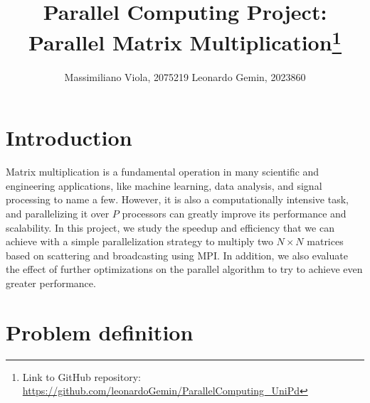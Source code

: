 \documentclass[11pt]{article}
\title{Parallel Computing Project:\\Parallel Matrix Multiplication\footnote{Link to GitHub repository: \url{https://github.com/leonardoGemin/ParallelComputing_UniPd}}}
\author{Massimiliano Viola, 2075219 \qquad Leonardo Gemin, 2023860}
\date{}
\begin{document}
\maketitle

\section{Introduction}

Matrix multiplication is a fundamental operation in many scientific and engineering applications, like machine learning, data analysis, and signal processing to name a few. However, it is also a computationally intensive task, and parallelizing it over $P$ processors can greatly improve its performance and scalability. In this project, we study the speedup and efficiency that we can achieve with a simple parallelization strategy to multiply two $N\times N$ matrices based on scattering and broadcasting using MPI. In addition, we also evaluate the effect of further optimizations on the parallel algorithm to try to achieve even greater performance.

\section{Problem definition}
\end{document}
